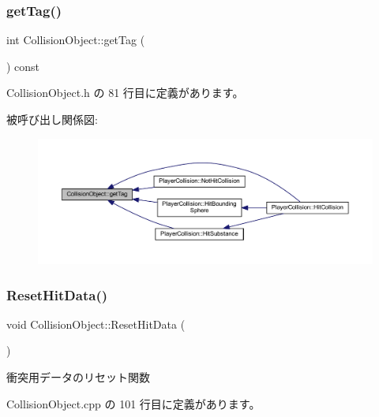 \subsubsection{\texorpdfstring{get\+Tag()}{getTag()}}
{\footnotesize\ttfamily int Collision\+Object\+::get\+Tag (\begin{DoxyParamCaption}{ }\end{DoxyParamCaption}) const\hspace{0.3cm}{\ttfamily [inline]}}



 Collision\+Object.\+h の 81 行目に定義があります。

被呼び出し関係図\+:\nopagebreak
\begin{figure}[H]
\begin{center}
\leavevmode
\includegraphics[width=350pt]{class_collision_object_a1198d5941d2ba8a9b394c0e43e4b9fd9_icgraph}
\end{center}
\end{figure}
\mbox{\label{class_collision_object_a92dd5d21c6674605d290e0d37d64505a}} 
\subsubsection{\texorpdfstring{Reset\+Hit\+Data()}{ResetHitData()}}
{\footnotesize\ttfamily void Collision\+Object\+::\+Reset\+Hit\+Data (\begin{DoxyParamCaption}{ }\end{DoxyParamCaption})}



衝突用データのリセット関数 



 Collision\+Object.\+cpp の 101 行目に定義があります。


